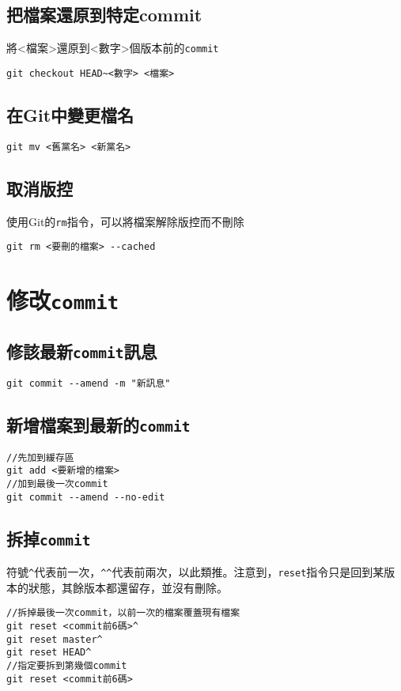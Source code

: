 \documentclass{article}
\newcommand{\code}[1]{\texttt{#1}}
\begin{document}
\subsection{把檔案還原到特定commit}
將<檔案>還原到<數字>個版本前的\code{commit}
\begin{lstlisting}[language=git]
git checkout HEAD~<數字> <檔案>
\end{lstlisting}

\subsection{在Git中變更檔名}
\begin{lstlisting}[language=git]
	git mv <舊黨名> <新黨名>
\end{lstlisting}

\subsection{取消版控}
使用Git的\texttt{rm}指令，可以將檔案解除版控而不刪除
\begin{lstlisting}[language=git]
git rm <要刪的檔案> --cached
\end{lstlisting}

\section{修改\texttt{commit}}
\subsection{修該最新\code{commit}訊息}
\begin{lstlisting}[language=git]
git commit --amend -m "新訊息"
\end{lstlisting}

\subsection{新增檔案到最新的\code{commit}}
\begin{lstlisting}[language=git]
//先加到緩存區
git add <要新增的檔案>
//加到最後一次commit
git commit --amend --no-edit
\end{lstlisting}

\subsection{拆掉\code{commit}}
符號\code{\^{}}代表前一次，\code{\^{}\^{}}代表前兩次，以此類推。注意到，\code{reset}指令只是回到某版本的狀態，其餘版本都還留存，並沒有刪除。
\begin{lstlisting}
//拆掉最後一次commit，以前一次的檔案覆蓋現有檔案
git reset <commit前6碼>^
git reset master^
git reset HEAD^
//指定要拆到第幾個commit
git reset <commit前6碼>
\end{lstlisting}
\end{document}
